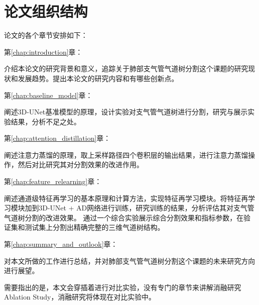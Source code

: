 \section{论文组织结构}

论文的各个章节安排如下：

{\kaishu 第\ref{chap:introduction}章：}

介绍本论文的研究背景和意义，追踪关于肺部支气管气道树分割这个课题的研究现状和发展趋势。提出本论文的研究内容和有哪些创新点。

{\kaishu 第\ref{chap:baseline_model}章：}

阐述3D-UNet基准模型的原理，设计实验对支气管气道树进行分割，研究与展示实验结果，分析不足之处。

{\kaishu 第\ref{chap:attention_distillation}章：}

阐述注意力蒸馏的原理，取上采样路径四个卷积层的输出结果，进行注意力蒸馏操作，然后对比研究其对分割效果的改进作用。

{\kaishu 第\ref{chap:feature_relearning}章：}

阐述通道级特征再学习的基本原理和计算方法，实现特征再学习模块。将特征再学习模块加到3D-UNet + AD网络进行训练，研究训练的结果，分析评估其对支气管气道树分割的改进效果。
通过一个综合实验展示综合分割效果和指标参数，在验证集和测试集上分割出精确完整的三维气道树结构。

{\kaishu 第\ref{chap:summary_and_outlook}章：}

对本文所做的工作进行总结，并对肺部支气管气道树分割这个课题的未来研究方向进行展望。

需要指出的是，本文会穿插着进行对比实验，没有专门的章节来讲解消融研究Ablation Study，消融研究将体现在对比实验中。




